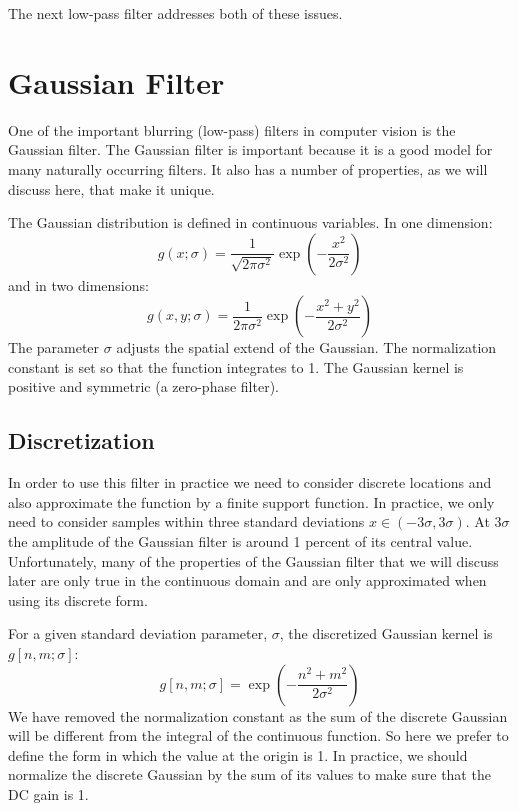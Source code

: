 The next low-pass filter addresses both of these issues.

\section{Gaussian Filter}
\label{sec:spt_gaussian}

One of the important blurring (low-pass) filters in computer vision is the Gaussian filter. 
The Gaussian filter is important because it is a good model for many naturally occurring filters. It also has a number of properties, as we will discuss here, that make it unique. 

The Gaussian distribution is defined in continuous variables. In one dimension:
\begin{equation}
g(x; \sigma) = \frac{1}{\sqrt{2 \pi \sigma^2}} \exp{ \left( -\frac{x^2}{2 \sigma^2} \right) }
\label{eq:gauss1dcont}
\end{equation}
and in two dimensions:
\begin{equation}
g(x,y; \sigma) = \frac{1}{2 \pi \sigma^2} \exp{ \left(-\frac{x^2 +
   y^2}{2 \sigma^2} \right) }
\label{eq:gauss2dcont}
\end{equation}
The parameter $\sigma$ adjusts the spatial extend of the Gaussian. The normalization constant is set so that the function integrates to 1. The Gaussian kernel is positive and symmetric (a zero-phase filter).




\subsection{Discretization}



In order to use this filter in practice we need to consider discrete locations and also approximate the function by a finite support function. In practice, we only need to consider samples within three standard deviations $x \in (-3\sigma, 3\sigma)$. At $3\sigma$ the amplitude of the Gaussian filter is around 1 percent of its central value. Unfortunately, many of the properties of the Gaussian filter that we will discuss later are only true in the continuous domain and are only approximated when using its discrete form. 

For a given standard deviation parameter, $\sigma$, the discretized Gaussian kernel is $g \left[n, m; \sigma \right]$:
\begin{equation}
g \left[ n,m; \sigma \right] = \exp{ \left( -\frac{n^2 + m^2}{2 \sigma^2} \right) }
\label{eq:gauss2d}
\end{equation}
We have removed the normalization constant as the sum of the discrete Gaussian will be different from the integral of the continuous function. So here we prefer to define the form in which the value at the origin is 1. In practice, we should normalize the discrete Gaussian by the sum of its values to make sure that the DC gain is 1. 

